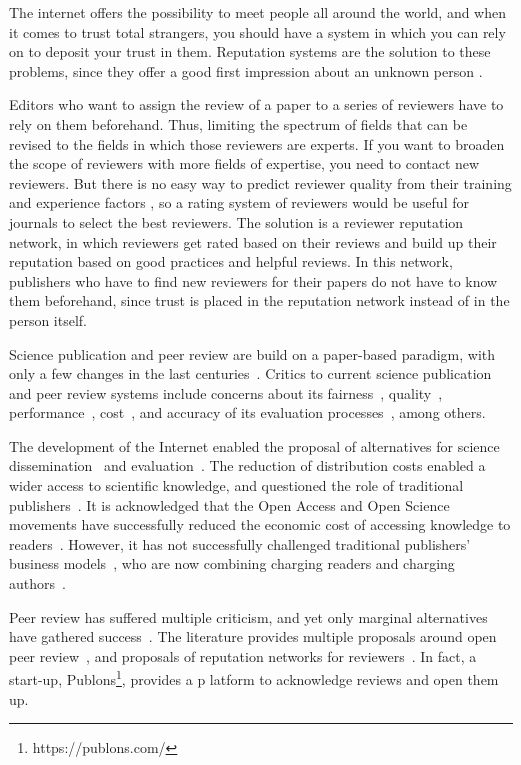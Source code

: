 The internet offers the possibility to meet people all around the world, and
when it comes to trust total strangers, you should have a system in which you
can rely on to deposit your trust in them. Reputation systems are the solution
to these problems, since they offer a good first impression about an unknown
person \cite{resnick2000reputation}.

Editors who want to assign the review of a paper to a series of reviewers have
to rely on them beforehand. Thus, limiting the spectrum of fields that can be
revised to the fields in which those reviewers are experts. If you want to
broaden the scope of reviewers with more fields of expertise, you need to
contact new reviewers. But there is no easy way to predict reviewer quality from
their training and experience factors \cite{callaham_relationship_2007}, so a
rating system of reviewers would be useful for journals to select the best
reviewers. The solution is a reviewer reputation network, in which reviewers get
rated based on their reviews and build up their reputation based on good
practices and helpful reviews. In this network, publishers who have to find new
reviewers for their papers do not have to know them beforehand, since trust is
placed in the reputation network instead of in the person itself.

Science publication and peer review are build on a paper-based paradigm, with
only a few changes in the last centuries~\cite{spier2002history}. Critics to
current science publication and peer review systems include concerns about its
fairness~\cite{wenneras2001nepotism}, quality~\cite{goldbeck1999evidence},
performance~\cite{huisman2017duration}, cost~\cite{bergstrom2004costs}, and
accuracy of its evaluation processes~\cite{doi:10.1001/jama.295.1.90}, among
others.

The development of the Internet enabled the proposal of alternatives for science
dissemination~\cite{eysenbach2006citation} and
evaluation~\cite{walker_emerging_2015}. The reduction of distribution costs
enabled a wider access to scientific knowledge, and questioned the role of
traditional publishers~\cite{ReinventingRigor}. It is acknowledged that the Open
Access and Open Science movements have successfully reduced the economic cost of
accessing knowledge to readers~\cite{evans2009open}. However, it has not
successfully challenged traditional publishers' business
models~\cite{lariviere2015oligopoly}, who are now combining charging readers and
charging authors~\cite{van2013true}.

Peer review has suffered multiple criticism, and yet only marginal alternatives
have gathered success~\cite{ware2008peer}. The literature provides multiple
proposals around open peer review~\cite{ford2013defining}, and proposals of
reputation networks for reviewers~\cite{frishauf2009reputation}. In fact, a
start-up, Publons\footnote{https://publons.com/}, provides a p latform to
acknowledge reviews and open them up.

